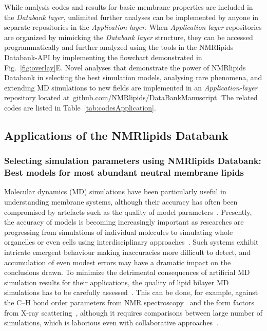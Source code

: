 \documentclass[fleqn,10pt]{wlscirep}
\begin{document}
While analysis codes and results for basic membrane properties are included in the {\it Databank layer}, unlimited further analyses can be implemented by anyone in separate repositories in the {\it Application layer}. When {\it Application layer} repositories are organized by mimicking the {\it Databank layer} structure, they can be accessed programmatically and further analyzed using the tools in the NMRlipids Databank-API by implementing the flowchart demonstrated in Fig.~\ref{fig:overlay}E. Novel analyses that demonstrate the power of NMRlipids Databank in selecting the best simulation models, analysing rare phenomena, and extending MD simulations to new fields are implemented in an {\it Application-layer} repository located at~\href{https://github.com/NMRlipids/DataBankManuscript}{github.com/NMRlipids/DataBankManuscript}. The related codes are listed in Table~\ref{tab:codesApplication}.


\subsection{Applications of the NMRlipids Databank}
\subsubsection{Selecting simulation parameters using NMRlipids Databank: Best models for most abundant neutral membrane lipids}
Molecular dynamics (MD) simulations have been particularly useful in understanding membrane systems, although their accuracy has often been compromised by artefacts such as the quality of model parameters~\cite{antila22b,gupta22}. Presently, the accuracy of models is becoming increasingly important as researches are progressing from simulations of individual molecules to simulating whole organelles or even cells using interdisciplinary approaches~\cite{johnson15,thornburg22,gupta22}. Such systems exhibit intricate emergent behaviour making inaccuracies more difficult to detect, and accumulation of even modest errors may have a dramatic impact on the conclusions drawn. To minimize the detrimental consequences of artificial MD simulation results for their applications, the quality of lipid bilayer MD simulations has to be carefully assessed~\cite{antila22b}. This can be done, for example, against the C--H bond order parameters from NMR spectroscopy~\cite{bacle21,Wur23} and the form factors from X-ray scattering~\cite{ollila16}, although it requires comparisons between large number of simulations, which is laborious even with collaborative approaches~\cite{botan15,catte16,antila19,bacle21}. 
\end{document}
